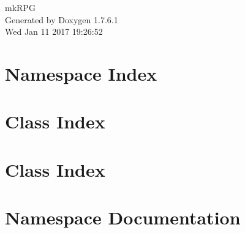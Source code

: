 \documentclass[a4paper]{book}
\begin{document}
\hypersetup{pageanchor=false,citecolor=blue}
\begin{titlepage}
\vspace*{7cm}
\begin{center}
{\Large mk\-R\-P\-G }\\
\vspace*{1cm}
{\large \-Generated by Doxygen 1.7.6.1}\\
\vspace*{0.5cm}
{\small Wed Jan 11 2017 19:26:52}\\
\end{center}
\end{titlepage}
\clearemptydoublepage
{}
\tableofcontents
\clearemptydoublepage
{}
\hypersetup{pageanchor=true,citecolor=blue}
\chapter{\-Namespace \-Index}

\chapter{\-Class \-Index}

\chapter{\-Class \-Index}

\chapter{\-Namespace \-Documentation}



































\end{document}
